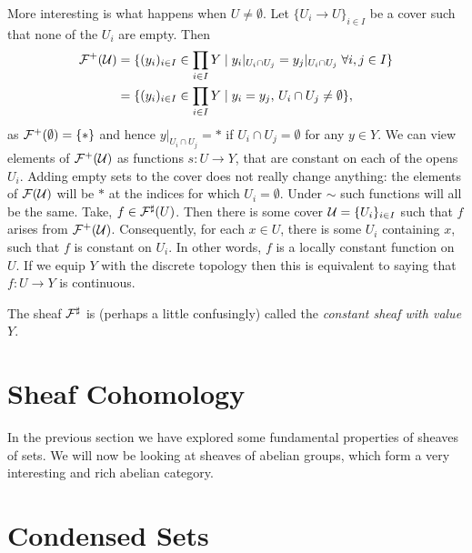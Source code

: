 \documentclass{article}
\begin{document}
\begin{example}
    More interesting is what happens when $U \neq \emptyset$.
    Let $\{U_i \to U\}_{i\in I}$ be a cover such that
    none of the $U_i$ are empty. Then
    \begin{align*}
        \mathcal{F}^+(\mathcal{U}) & =
        \{(y_i)_{i\in I}\in \prod_{i\in I} Y \mid
        y_i|_{U_i \cap U_j} = y_j|_{U_i \cap U_j}\; \forall i,j \in I\} \\
                     & = \{(y_i)_{i\in I}\in \prod_{i\in I}Y\mid
        y_i = y_j,\, U_i \cap U_j \neq \emptyset\},
    \end{align*}
    as $\mathcal{F}^+(\emptyset) = \{*\}$ and hence $y|_{U_i \cap U_j} = *$
    if $U_i \cap U_j = \emptyset$ for any $y \in Y$.
    We can view elements of $\mathcal{F}^+(\mathcal{U})$ as functions $s\colon U \to Y$,
    that are constant on each of the opens $U_i$.
    Adding empty sets
    to the cover does not really change anything: the elements of
    $\mathcal{F}(\mathcal{U})$ will be $*$ at the indices for which $U_i = \emptyset$.
    Under $\sim$ such functions will all be the same.
    Take, $f \in \mathcal{F}^\sharp(U)$. Then there is some cover
    $\mathcal{U} = \{U_i\}_{i\in I}$ such that $f$
    arises from $\mathcal{F}^+(\mathcal{U})$. Consequently, for each $x\in U$,
    there is some $U_i$ containing $x$, such that $f$
    is constant on $U_i$. In other words, $f$ is a locally
    constant function on $U$. If we equip $Y$ with the discrete
    topology then this is equivalent to saying that $f\colon U \to Y$
    is continuous.

    The sheaf $\mathcal{F}^\sharp$ is (perhaps a little confusingly) called the
    \emph{constant sheaf with value $Y$}.
\end{example}
\section{Sheaf Cohomology}

In the previous section we have explored some
fundamental properties of sheaves of sets.
We will now be looking at sheaves of abelian groups,
which form a very interesting and rich abelian category.
\section{Condensed Sets}


\end{document}
